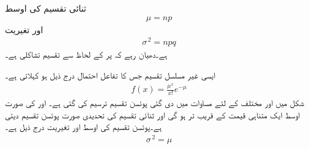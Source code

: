 ثنائی تقسیم کی اوسط
\begin{align}
\mu=np
\end{align}
اور تغیریت 
\begin{align}
\sigma^{\,2}=npq
\end{align}
ہے۔دھیان رہے کہ  پر  کے لحاظ سے تقسیم تشاکلی ہے۔

ایسی غیر مسلسل تقسیم جس کا تفاعل احتمال درج ذیل ہو  کہلاتی ہے۔ 
\begin{align}\label{مساوات_شماریات_پوئسن_تقسیم_الف}
f(x)=\frac{\mu^x}{x!}e^{-\mu}
\end{align}
شکل  میں  اور مختلف  کے لئے  مساوات  میں دی گئی پوئسن تقسیم ترسیم کی گئی ہے۔ اور  کی صورت اوسط  ایک متناہی قیمت کے قریب تر ہو گی اور  ثنائی تقسیم  کی  تحدیدی صورت  پوئسن تقسیم دیتی ہے۔پوئسن تقسیم کی اوسط  اور تغیریت درج ذیل ہے۔
\begin{align}
\sigma^{\,2}=\mu
\end{align}

